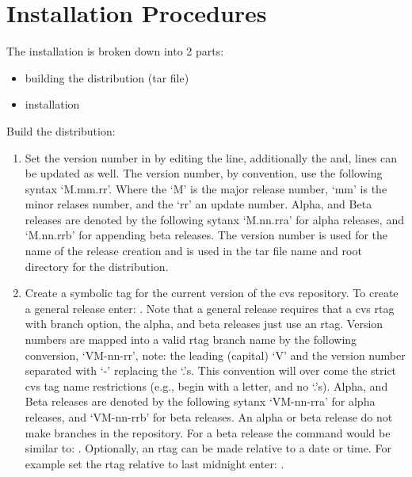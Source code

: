 \section{Installation Procedures}
\label{Installation Procedures}

The installation is broken down into 2 parts: 
  \begin{itemize}
  \item building the distribution (tar file)
  \item installation
  \end{itemize}

Build the \hypre{} distribution:

\begin{enumerate}

   \item Set the version number in  by editing
   the  line, additionally the
    and,
    lines can be updated as well.
   The version number, by convention, use the following syntax `M.mm.rr'.
   Where the `M' is the major release number, `mm' is the minor
   relases number, and the `rr' an update number. Alpha, and Beta 
   releases are denoted by the following sytanx `M.nn.rra' for 
   alpha releases, and `M.nn.rrb' for appending beta releases. The version 
   number is used for the name of the release creation and is used
   in the tar file name and root directory for the distribution.

   \item Create a symbolic tag for the current version
   of the cvs repository. To create a general release enter:
   . Note that a
   general release requires that a cvs rtag with branch option,
   the alpha, and beta releases just use an rtag.
   Version numbers are mapped into a valid rtag branch name by the
   following conversion, `VM-nn-rr', note: the leading (capital)
   `V' and the version number separated with `-' replacing
   the `.'s. This convention will over come the strict cvs
   tag name restrictions (e.g., begin with a letter, and no `.'s).
   Alpha, and Beta releases are denoted by the following sytanx 
   `VM-nn-rra' for alpha releases, and `VM-nn-rrb' for beta 
   releases. An alpha or beta release do not make branches in 
   the repository. For a beta release the command would be similar to: 
   . Optionally, an rtag
   can be made relative to a date or time. For example set the
   rtag relative to last midnight enter:
   .


\end{enumerate}
